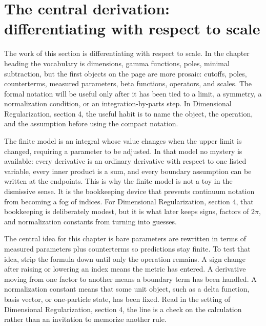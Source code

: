 \section{The central derivation: differentiating with respect to scale}













The work of this section is differentiating with respect to scale.  In the chapter heading the vocabulary is dimensions, gamma functions, poles, minimal subtraction, but the first objects on the page are more prosaic: cutoffs, poles, counterterms, measured parameters, beta functions, operators, and scales.  The formal notation will be useful only after it has been tied to a limit, a symmetry, a normalization condition, or an integration-by-parts step.  In Dimensional Regularization, section 4, the useful habit is to name the object, the operation, and the assumption before using the compact notation.

The finite model is an integral whose value changes when the upper limit is changed, requiring a parameter to be adjusted.  In that model no mystery is available: every derivative is an ordinary derivative with respect to one listed variable, every inner product is a sum, and every boundary assumption can be written at the endpoints.  This is why the finite model is not a toy in the dismissive sense.  It is the bookkeeping device that prevents continuum notation from becoming a fog of indices.  For Dimensional Regularization, section 4, that bookkeeping is deliberately modest, but it is what later keeps signs, factors of \(2\pi\), and normalization constants from turning into guesses.

The central idea for this chapter is bare parameters are rewritten in terms of measured parameters plus counterterms so predictions stay finite.  To test that idea, strip the formula down until only the operation remains.  A sign change after raising or lowering an index means the metric has entered.  A derivative moving from one factor to another means a boundary term has been handled.  A normalization constant means that some unit object, such as a delta function, basis vector, or one-particle state, has been fixed.  Read in the setting of Dimensional Regularization, section 4, the line is a check on the calculation rather than an invitation to memorize another rule.

